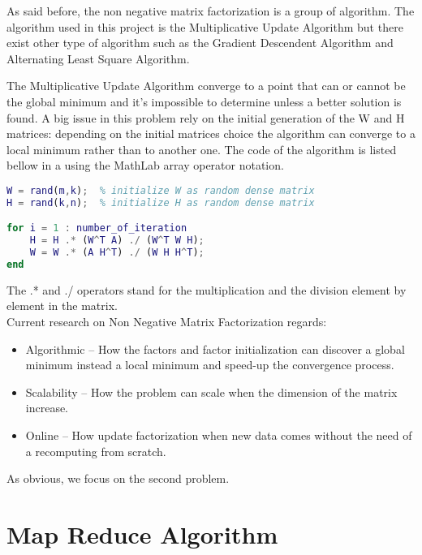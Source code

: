 \documentclass[a4paper,12pt]{article}
\begin{document}
As said before, the non negative matrix factorization is a group of algorithm. The algorithm used in this project is the Multiplicative Update Algorithm but there exist other type of algorithm such as the Gradient Descendent Algorithm and Alternating Least Square Algorithm. 

The Multiplicative Update Algorithm converge to a point that can or cannot be the global minimum and it's impossible to determine unless a better solution is found. A big issue in this problem rely on the initial generation of the W and H matrices: depending on the initial matrices choice the algorithm can converge to a local minimum rather than to another one. The code of the algorithm is listed bellow in a using the MathLab array operator notation.

\begin{lstlisting}[language=Matlab]
W = rand(m,k);	% initialize W as random dense matrix 
H = rand(k,n);	% initialize H as random dense matrix 

for i = 1 : number_of_iteration
	H = H .* (W^T A) ./ (W^T W H);
	W = W .* (A H^T) ./ (W H H^T);
end
\end{lstlisting}
The .* and ./ operators stand for the multiplication and the division element by element in the matrix. \\


Current research on Non Negative Matrix Factorization regards:
\begin{itemize}
  \item Algorithmic -- How the factors and factor initialization can discover a global minimum instead a local minimum and speed-up the convergence process.
   \item Scalability -- How the problem can scale when the dimension of the matrix increase.
    \item Online -- How update factorization when new data comes without the need of a recomputing from scratch.
\end{itemize}

As obvious, we focus on the second problem.

\section{Map Reduce Algorithm \cite{liu2010}}
\end{document}
